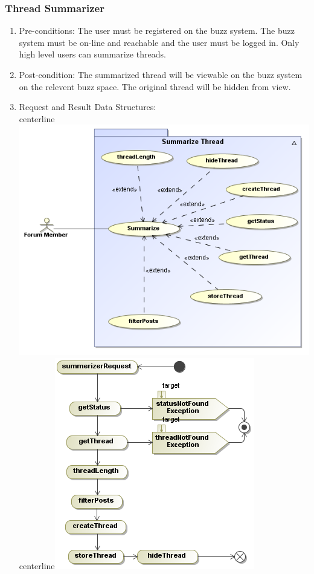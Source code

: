 \documentclass[hidelinks, 12pt, oneside]{article}
\begin{document}
\subsubsection{Thread Summarizer}
\begin{enumerate}
 \item Pre-conditions:  The user must be registered on the buzz system. The buzz system must be on-line and reachable and the user must be logged in. Only high level users can summarize threads.
 \item Post-condition:  The summarized thread will be viewable on the buzz system on the relevent buzz space. The original thread will be hidden from view.

\item Request and Result Data Structures:\\
   centerline{\includegraphics[scale=0.4]{SummarizeThreadUseCases}}\\
 centerline{\includegraphics[scale=0.4]{SummarizeRequestActivities}} 
\end{enumerate}
\end{document}
